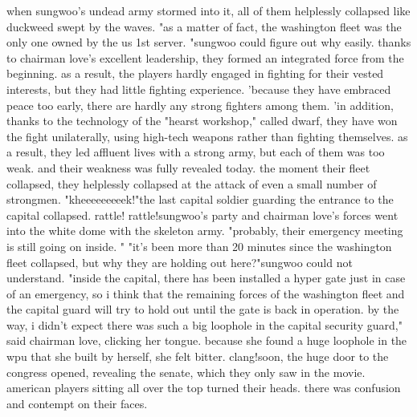 when sungwoo's undead army stormed into it, all of them helplessly collapsed like duckweed swept by the waves.
"as a matter of fact, the washington fleet was the only one owned by the us 1st server.
"sungwoo could figure out why easily.
 thanks to chairman love's excellent leadership, they formed an integrated force from the beginning.
as a result, the players hardly engaged in fighting for their vested interests, but they had little fighting experience.
'because they have embraced peace too early, there are hardly any strong fighters among them.
'in addition, thanks to the technology of the "hearst workshop," called dwarf, they have won the fight unilaterally, using high-tech weapons rather than fighting themselves.
 as a result, they led affluent lives with a strong army, but each of them was too weak.
and their weakness was fully revealed today.
 the moment their fleet collapsed, they helplessly collapsed at the attack of even a small number of strongmen.
"kheeeeeeeeek!"the last capital soldier guarding the entrance to the capital collapsed.
rattle! rattle!sungwoo's party and chairman love's forces went into the white dome with the skeleton army.
 "probably, their emergency meeting is still going on inside.
" "it's been more than 20 minutes since the washington fleet collapsed, but why they are holding out here?"sungwoo could not understand.
 "inside the capital, there has been installed a hyper gate just in case of an emergency, so i think that the remaining forces of the washington fleet and the capital guard will try to hold out until the gate is back in operation.
 by the way, i didn't expect there was such a big loophole in the capital security guard," said chairman love, clicking her tongue.
 because she found a huge loophole in the wpu that she built by herself, she felt bitter.
 clang!soon, the huge door to the congress opened, revealing the senate, which they only saw in the movie.
 american players sitting all over the top turned their heads.
 there was confusion and contempt on their faces.


 